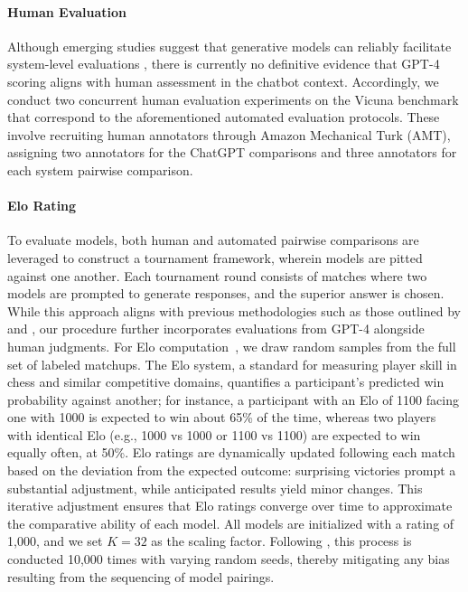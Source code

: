 \paragraph{Human Evaluation} Although emerging studies suggest that generative models can reliably facilitate system-level evaluations \citep{fu2023gptscore}, there is currently no definitive evidence that GPT-4 scoring aligns with human assessment in the chatbot context. Accordingly, we conduct two concurrent human evaluation experiments on the Vicuna benchmark that correspond to the aforementioned automated evaluation protocols. These involve recruiting human annotators through Amazon Mechanical Turk (AMT), assigning two annotators for the ChatGPT comparisons and three annotators for each system pairwise comparison.

\paragraph{Elo Rating} To evaluate models, both human and automated pairwise comparisons are leveraged to construct a tournament framework, wherein models are pitted against one another. Each tournament round consists of matches where two models are prompted to generate responses, and the superior answer is chosen. While this approach aligns with previous methodologies such as those outlined by \citet{bai2022training} and \citet{vicuna2023}, our procedure further incorporates evaluations from GPT-4 alongside human judgments. For Elo computation~\citep{elo1967proposed,elo1978rating}, we draw random samples from the full set of labeled matchups. The Elo system, a standard for measuring player skill in chess and similar competitive domains, quantifies a participant’s predicted win probability against another; for instance, a participant with an Elo of 1100 facing one with 1000 is expected to win about 65\% of the time, whereas two players with identical Elo (e.g., 1000 vs 1000 or 1100 vs 1100) are expected to win equally often, at 50\%. Elo ratings are dynamically updated following each match based on the deviation from the expected outcome: surprising victories prompt a substantial adjustment, while anticipated results yield minor changes. This iterative adjustment ensures that Elo ratings converge over time to approximate the comparative ability of each model. All models are initialized with a rating of 1,000, and we set $K=32$ as the scaling factor. Following \citet{vicuna2023}, this process is conducted 10,000 times with varying random seeds, thereby mitigating any bias resulting from the sequencing of model pairings.

